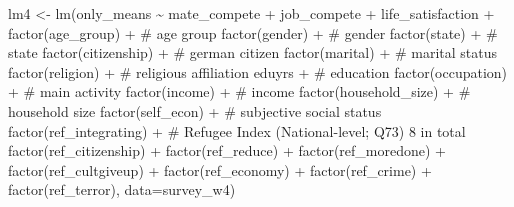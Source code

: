 \documentclass[
]{article}
\newenvironment{Shaded}{\begin{snugshade}}{\end{snugshade}}
\newcommand{\AttributeTok}[1]{\textcolor[rgb]{0.40,0.45,0.13}{#1}}
\newcommand{\CommentTok}[1]{\textcolor[rgb]{0.37,0.37,0.37}{#1}}
\newcommand{\FunctionTok}[1]{\textcolor[rgb]{0.28,0.35,0.67}{#1}}
\newcommand{\NormalTok}[1]{\textcolor[rgb]{0.00,0.23,0.31}{#1}}
\newcommand{\OtherTok}[1]{\textcolor[rgb]{0.00,0.23,0.31}{#1}}
\newcommand{\SpecialCharTok}[1]{\textcolor[rgb]{0.37,0.37,0.37}{#1}}
\begin{document}
\begin{Shaded}
\begin{Highlighting}[]
\NormalTok{lm4 }\OtherTok{\textless{}{-}} \FunctionTok{lm}\NormalTok{(only\_means }\SpecialCharTok{\textasciitilde{}}\NormalTok{ mate\_compete }\SpecialCharTok{+}\NormalTok{ job\_compete }\SpecialCharTok{+}\NormalTok{ life\_satisfaction }\SpecialCharTok{+} 
            \FunctionTok{factor}\NormalTok{(age\_group) }\SpecialCharTok{+}   \CommentTok{\# age group}
            \FunctionTok{factor}\NormalTok{(gender) }\SpecialCharTok{+}   \CommentTok{\# gender }
            \FunctionTok{factor}\NormalTok{(state) }\SpecialCharTok{+}   \CommentTok{\# state  }
            \FunctionTok{factor}\NormalTok{(citizenship) }\SpecialCharTok{+}  \CommentTok{\# german citizen}
            \FunctionTok{factor}\NormalTok{(marital) }\SpecialCharTok{+}  \CommentTok{\# marital status}
            \FunctionTok{factor}\NormalTok{(religion) }\SpecialCharTok{+}  \CommentTok{\# religious affiliation}
\NormalTok{            eduyrs }\SpecialCharTok{+}  \CommentTok{\# education}
            \FunctionTok{factor}\NormalTok{(occupation) }\SpecialCharTok{+}  \CommentTok{\# main activity}
            \FunctionTok{factor}\NormalTok{(income) }\SpecialCharTok{+} \CommentTok{\# income}
            \FunctionTok{factor}\NormalTok{(household\_size) }\SpecialCharTok{+} \CommentTok{\# household size}
            \FunctionTok{factor}\NormalTok{(self\_econ) }\SpecialCharTok{+} \CommentTok{\# subjective social status}
            \FunctionTok{factor}\NormalTok{(ref\_integrating) }\SpecialCharTok{+} \CommentTok{\# Refugee Index (National{-}level; Q73) 8 in total}
            \FunctionTok{factor}\NormalTok{(ref\_citizenship) }\SpecialCharTok{+} \FunctionTok{factor}\NormalTok{(ref\_reduce) }\SpecialCharTok{+} \FunctionTok{factor}\NormalTok{(ref\_moredone) }\SpecialCharTok{+} \FunctionTok{factor}\NormalTok{(ref\_cultgiveup) }\SpecialCharTok{+} 
            \FunctionTok{factor}\NormalTok{(ref\_economy) }\SpecialCharTok{+} \FunctionTok{factor}\NormalTok{(ref\_crime) }\SpecialCharTok{+} \FunctionTok{factor}\NormalTok{(ref\_terror),}
          \AttributeTok{data=}\NormalTok{survey\_w4)}


\end{Highlighting}
\end{Shaded}
\end{document}
